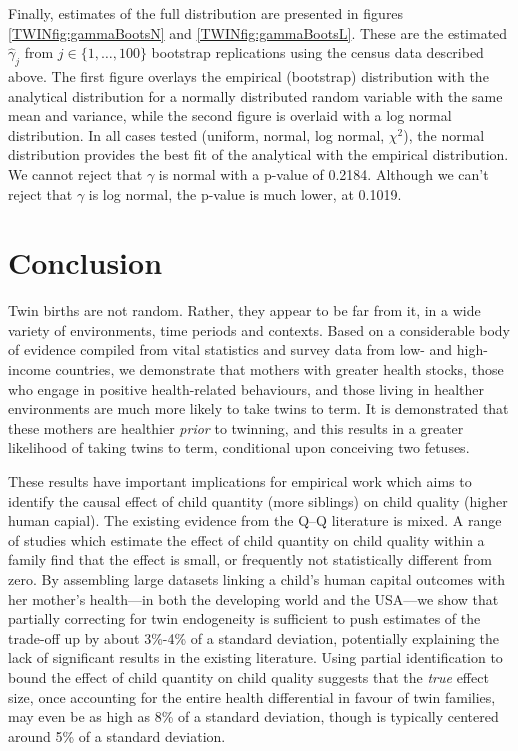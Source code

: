 \documentclass[subeqn]{article}
\begin{document}
\begin{spacing}{1.4}
Finally, estimates of the full distribution are presented in figures
\ref{TWINfig:gammaBootsN} and \ref{TWINfig:gammaBootsL}.  These are
the estimated $\hat\gamma_j$ from $j \in \{1,\ldots,100\}$ bootstrap
replications using the census data described above.  The first figure
overlays the empirical (bootstrap) distribution with the analytical
distribution for a normally distributed random variable with the same mean
and variance, while the second figure is overlaid with a log normal
distribution.  In all cases tested (uniform, normal, log normal, $\chi^2$),
the normal distribution provides the best fit of the analytical with the
empirical distribution. We cannot reject that $\gamma$ is normal with a
p-value of 0.2184.  Although we can't reject that $\gamma$ is log normal,
the p-value is much lower, at 0.1019.



\section{Conclusion}                               \label{TWINscn:conclusion}
Twin births are not random.  Rather, they appear to be far from it, in a wide
variety of environments, time periods and contexts.  Based on a considerable 
body of evidence compiled from vital statistics and survey data from low- and 
high-income countries, we demonstrate that mothers with greater health stocks,
those who engage in positive health-related behaviours, and those living in 
healther environments are much more likely to take twins to term.  It is 
demonstrated that these mothers are healthier \emph{prior} to twinning, and
this results in a greater likelihood of taking twins to term, conditional upon
conceiving two fetuses.

These results have important implications for empirical work which aims to 
identify the causal effect of child quantity (more siblings) on child quality
(higher human capial).  The existing evidence from the Q--Q literature is 
mixed.  A range of studies which estimate the effect of child quantity on child 
quality within a family find that the effect is small, or frequently not 
statistically different from zero.  By assembling large datasets linking a 
child's human capital outcomes with her mother's health---in both the developing 
world and the USA---we show that partially correcting for twin endogeneity is 
sufficient to push estimates of the trade-off up by about 3\%-4\% of a standard 
deviation, potentially explaining the lack of significant results in the 
existing literature.  Using partial identification to bound the effect of child 
quantity on child quality suggests that the \emph{true} effect size, once 
accounting for the entire health differential in favour of twin families, may 
even be as high as 8\% of a standard deviation, though is typically centered
around 5\% of a standard deviation.


\end{spacing}
\end{document}
